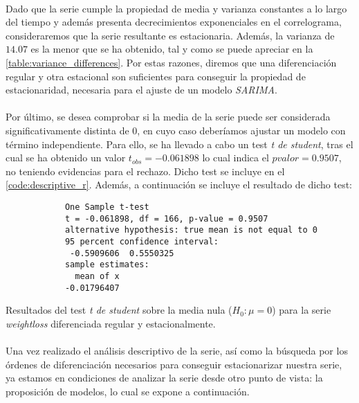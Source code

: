 \documentclass[a4paper, spanish]{article}
\begin{document}
        \paragraph{}
        Dado que la serie cumple la propiedad de media y varianza constantes a lo largo del tiempo y además presenta decrecimientos exponenciales en el correlograma, consideraremos que la serie resultante es estacionaria. Además, la varianza de $14.07$ es la menor que se ha obtenido, tal y como se puede apreciar en la \autoref{table:variance_differences}. Por estas razones, diremos que una diferenciación regular y otra estacional son suficientes para conseguir la propiedad de estacionaridad, necesaria para el ajuste de un modelo \emph{SARIMA}.

        \paragraph{}
        Por último, se desea comprobar si la media de la serie puede ser considerada significativamente distinta de $0$, en cuyo caso deberíamos ajustar un modelo con término independiente. Para ello, se ha llevado a cabo un test \emph{t de student}, tras el cual se ha obtenido un valor $t_{obs} = -0.061898$ lo cual indica el $pvalor = 0.9507$, no teniendo evidencias para el rechazo. Dicho test se incluye en el \autoref{code:descriptive_r}. Además, a continuación se incluye el resultado de dicho test:

        \begin{table}[htb!]
          \begin{Verbatim}
            One Sample t-test
            t = -0.061898, df = 166, p-value = 0.9507
            alternative hypothesis: true mean is not equal to 0
            95 percent confidence interval:
             -0.5909606  0.5550325
            sample estimates:
              mean of x
            -0.01796407
          \end{Verbatim}
          \caption{Resultados del test \emph{t de student} sobre la media nula ($H_0: \mu = 0$) para la serie \emph{weightloss} diferenciada regular y estacionalmente.}
          \label{result:zero_mean_test}
        \end{table}

    \paragraph{}
    Una vez realizado el análisis descriptivo de la serie, así como la búsqueda por los órdenes de diferenciación necesarios para conseguir estacionarizar nuestra serie, ya estamos en condiciones de analizar la serie desde otro punto de vista: la proposición de modelos, lo cual se expone a continuación.
\end{document}

